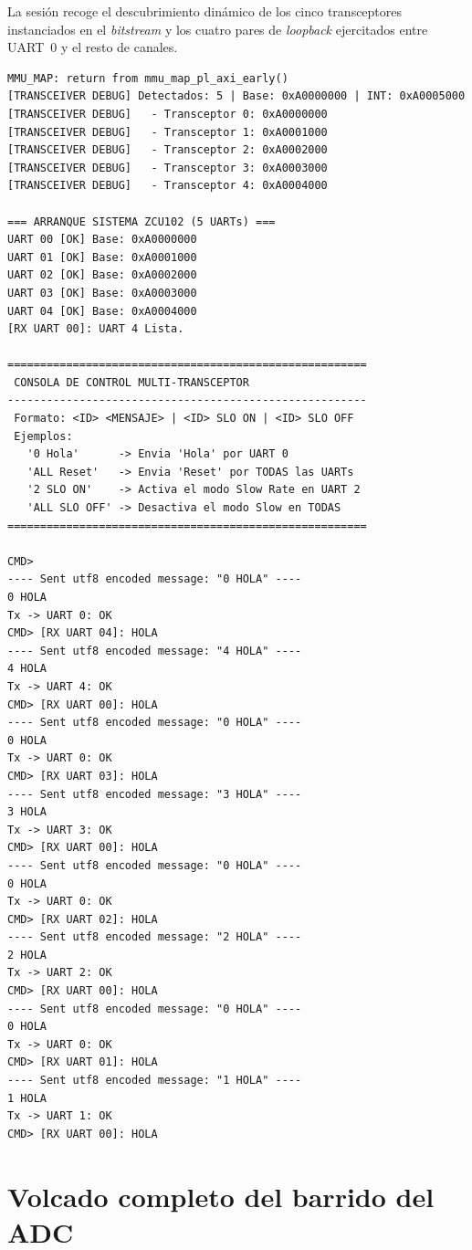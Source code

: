 La sesión recoge el descubrimiento dinámico de los cinco transceptores instanciados en el
\textit{bitstream} y los cuatro pares de \textit{loopback} ejercitados entre UART~0 y el
resto de canales.

\begin{lstlisting}[style=terminal, caption={Salida completa del terminal --- prueba RS422/RS485 con la placa AOCS (5 transceptores)}]
MMU_MAP: return from mmu_map_pl_axi_early()
[TRANSCEIVER DEBUG] Detectados: 5 | Base: 0xA0000000 | INT: 0xA0005000
[TRANSCEIVER DEBUG]   - Transceptor 0: 0xA0000000
[TRANSCEIVER DEBUG]   - Transceptor 1: 0xA0001000
[TRANSCEIVER DEBUG]   - Transceptor 2: 0xA0002000
[TRANSCEIVER DEBUG]   - Transceptor 3: 0xA0003000
[TRANSCEIVER DEBUG]   - Transceptor 4: 0xA0004000

=== ARRANQUE SISTEMA ZCU102 (5 UARTs) ===
UART 00 [OK] Base: 0xA0000000
UART 01 [OK] Base: 0xA0001000
UART 02 [OK] Base: 0xA0002000
UART 03 [OK] Base: 0xA0003000
UART 04 [OK] Base: 0xA0004000
[RX UART 00]: UART 4 Lista.

=======================================================
 CONSOLA DE CONTROL MULTI-TRANSCEPTOR
-------------------------------------------------------
 Formato: <ID> <MENSAJE> | <ID> SLO ON | <ID> SLO OFF
 Ejemplos:
   '0 Hola'      -> Envia 'Hola' por UART 0
   'ALL Reset'   -> Envia 'Reset' por TODAS las UARTs
   '2 SLO ON'    -> Activa el modo Slow Rate en UART 2
   'ALL SLO OFF' -> Desactiva el modo Slow en TODAS
=======================================================

CMD>
---- Sent utf8 encoded message: "0 HOLA" ----
0 HOLA
Tx -> UART 0: OK
CMD> [RX UART 04]: HOLA
---- Sent utf8 encoded message: "4 HOLA" ----
4 HOLA
Tx -> UART 4: OK
CMD> [RX UART 00]: HOLA
---- Sent utf8 encoded message: "0 HOLA" ----
0 HOLA
Tx -> UART 0: OK
CMD> [RX UART 03]: HOLA
---- Sent utf8 encoded message: "3 HOLA" ----
3 HOLA
Tx -> UART 3: OK
CMD> [RX UART 00]: HOLA
---- Sent utf8 encoded message: "0 HOLA" ----
0 HOLA
Tx -> UART 0: OK
CMD> [RX UART 02]: HOLA
---- Sent utf8 encoded message: "2 HOLA" ----
2 HOLA
Tx -> UART 2: OK
CMD> [RX UART 00]: HOLA
---- Sent utf8 encoded message: "0 HOLA" ----
0 HOLA
Tx -> UART 0: OK
CMD> [RX UART 01]: HOLA
---- Sent utf8 encoded message: "1 HOLA" ----
1 HOLA
Tx -> UART 1: OK
CMD> [RX UART 00]: HOLA
\end{lstlisting}

\section{Volcado completo del barrido del ADC} \label{anxC:volcado_adc}

